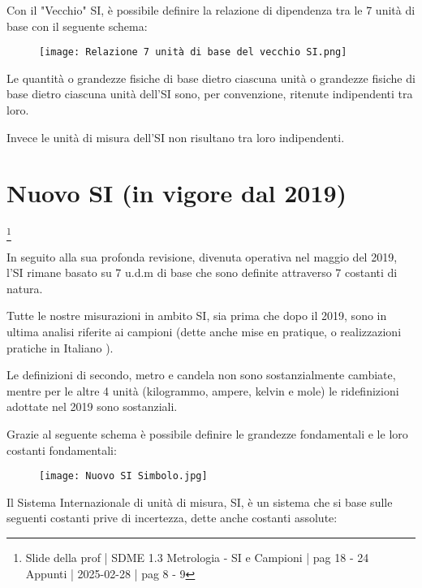 Con il "Vecchio" SI, è possibile definire la relazione di dipendenza tra le 7 unità di base con il seguente schema: 

\begin{figure}[h]
    \centering
    \texttt{[image: Relazione 7 unità di base del vecchio SI.png]}
\end{figure}

\newpage 

Le quantità o grandezze fisiche di base dietro ciascuna unità o grandezze fisiche di base 
dietro ciascuna unità dell'SI sono, per convenzione, ritenute indipendenti tra loro. \newline 

Invece le unità di misura dell'SI non risultano tra loro indipendenti. \newline 

\newpage 

\section{Nuovo SI (in vigore dal 2019)}
\footnote{Slide della prof | SDME 1.3 Metrologia - SI e Campioni | pag 18 - 24 \\  
Appunti | 2025-02-28 | pag 8 - 9}

In seguito alla sua profonda revisione, divenuta operativa nel maggio del 2019, 
l'SI rimane basato su 7 u.d.m di base che sono definite attraverso 7 costanti di natura. \newline 

Tutte le nostre misurazioni in ambito SI, sia prima che dopo il 2019, 
sono in ultima analisi riferite ai campioni (dette anche mise en pratique, o realizzazioni pratiche in Italiano ). \newline 

Le definizioni di secondo, metro e candela non sono sostanzialmente cambiate, 
mentre per le altre 4 unità (kilogrammo, ampere, kelvin e mole) le ridefinizioni adottate nel 2019 sono sostanziali. \newline 

Grazie al seguente schema è possibile definire le grandezze fondamentali e le loro costanti fondamentali: 

\begin{figure}[h]
    \centering
    \texttt{[image: Nuovo SI Simbolo.jpg]}
\end{figure}

Il Sistema Internazionale di unità di misura, SI, è un sistema che si base sulle seguenti 
costanti prive di incertezza, dette anche costanti assolute: 

